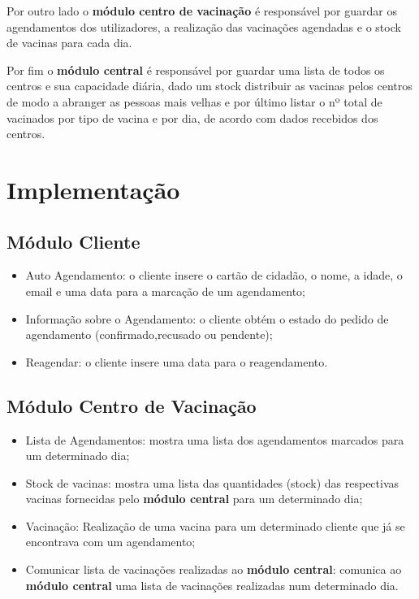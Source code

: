 \documentclass[11pt]{article}
\begin{document}
Por outro lado o \textbf{módulo centro de vacinação} é responsável por guardar os agendamentos dos utilizadores, a realização das vacinações agendadas e o stock de vacinas para cada dia.

Por fim o \textbf{módulo central} é responsável por guardar uma lista de todos os centros e sua capacidade diária, dado um stock distribuir as vacinas pelos centros de modo a abranger as pessoas mais velhas e por último listar o nº total de vacinados por tipo de vacina e por dia, de acordo com dados recebidos dos centros.
\section{Implementação}

\subsection{Módulo Cliente}

\begin{itemize}
    \item Auto Agendamento: o cliente insere o cartão de cidadão, o nome, a idade, o email e uma data para a marcação de um agendamento;
    \item Informação sobre o Agendamento: o cliente obtém o estado do pedido de agendamento (confirmado,recusado ou pendente);
    \item Reagendar: o cliente insere uma data para o reagendamento.
\end{itemize}

\subsection{Módulo Centro de Vacinação}

\begin{itemize}
    \item Lista de Agendamentos: mostra uma lista dos agendamentos marcados para um determinado dia;
    \item Stock de vacinas: mostra uma lista das quantidades (stock) das respectivas vacinas fornecidas pelo \textbf{módulo central} para um determinado dia;
    \item Vacinação: Realização de uma vacina para um determinado cliente que já se encontrava com um agendamento;
    \item Comunicar lista de vacinações realizadas ao \textbf{módulo central}: comunica ao  \textbf{módulo central} uma lista de vacinações realizadas num determinado dia.
\end{itemize}
\end{document}

